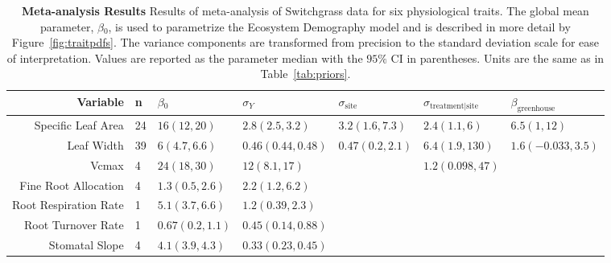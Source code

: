 \begin{sidewaystable}[ht]
\begin{center}
\begin{tabular}{rllllll}
  \hline
Variable & n & $\beta{_0}$ & $\sigma_{Y}$ & $\sigma_{\text{site}}$ & $\sigma_{\text{treatment|site}}$ & $\beta_{\text{greenhouse}}$ \\ 
  \hline
Specific Leaf Area & 24 & $16(12,20)$ & $2.8(2.5,3.2)$ & $3.2(1.6,7.3)$ & $2.4(1.1,6)$ & $6.5(1,12)$ \\ 
  Leaf Width & 39 & $6(4.7,6.6)$ & $0.46(0.44,0.48)$ & $0.47(0.2,2.1)$ & $6.4(1.9,130)$ & $1.6(-0.033,3.5)$ \\ 
  Vcmax & 4 & $24(18,30)$ & $12(8.1,17)$ &  & $1.2(0.098,47)$ &  \\ 
  Fine Root Allocation & 4 & $1.3(0.5,2.6)$ & $2.2(1.2,6.2)$ &  &  &  \\ 
  Root Respiration Rate & 1 & $5.1(3.7,6.6)$ & $1.2(0.39,2.3)$ &  &  &  \\ 
  Root Turnover Rate & 1 & $0.67(0.2,1.1)$ & $0.45(0.14,0.88)$ &  &  &  \\ 
  Stomatal Slope & 4 & $4.1(3.9,4.3)$ & $0.33(0.23,0.45)$ &  &  &  \\ 
   \hline
\end{tabular}
\caption{{\bf Meta-analysis Results} Results of meta-analysis of Switchgrass data for six physiological traits.  The global mean parameter, $\beta{_0}$, is used to parametrize the Ecosystem Demography model and is described in more detail by Figure~\ref{fig:traitpdfs}. The variance components are transformed from precision to the standard deviation scale for ease of interpretation. Values are reported as the parameter median with the $95\%$ CI in parentheses. Units are the same as in Table~\ref{tab:priors}.}
\label{tab:maresults}
\end{center}
\end{sidewaystable}

